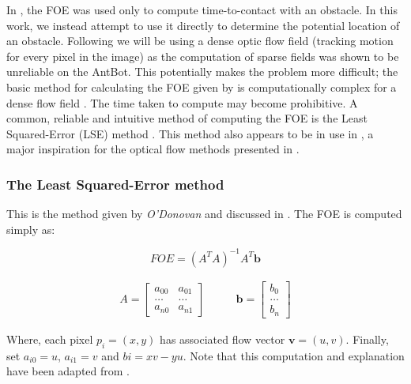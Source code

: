 \documentclass[a4paper,11pt,twoside,openright]{article}
\begin{document}
In \cite{Mitchell2018}, the FOE was used only to compute
time-to-contact with an obstacle. In this work, we instead attempt to
use it directly to determine the potential location of an
obstacle. Following \cite{Mitchell2018} we will be using a dense optic
flow field (tracking motion for every pixel in the image) as the
computation of sparse fields was shown to be unreliable on the
AntBot. This potentially makes the problem more difficult; the basic
method for calculating the FOE given by \cite{ODonovan2005} is
computationally complex for a dense flow field
\cite{Mitchell2018}. The time taken to compute may become
prohibitive. A common, reliable and intuitive method of computing the
FOE is the Least Squared-Error (LSE) method \cite{Tistarelli1991,
  ODonovan2005, Vanderstap2012}. This method also appears to be in use
in \cite{Souhila2007}, a major inspiration for the optical flow
methods presented in \cite{Mitchell2018}.

\subsubsection{The Least Squared-Error method}
This is the method given by \textit{O'Donovan} and discussed in
\cite{Mitchell2018}. The FOE is computed simply as:

\begin{equation}
  \label{eq:foe}
  FOE = (A^TA)^{-1}A^T\mathbf{b}
\end{equation}

\begin{equation*}
  \begin{split}
 A =
\begin{bmatrix}
  a_{00} & a_{01}\\
  \dots  & \dots \\
  a_{n0} &  a_{n1}
\end{bmatrix}
\qquad
\end{split}
\begin{split}
\mathbf{b} =
\begin{bmatrix}
  b_0 \\
  \dots \\
  b_n
\end{bmatrix}
\end{split}
\end{equation*}
\newline

Where, each pixel $p_i = (x, y)$ has associated flow vector $\mathbf{v} = (u,v)$.
Finally, set $a_{i0} = u$, $a_{i1} = v$ and $b{i} = xv - yu$. Note that this
computation and explanation have been adapted from \cite{Mitchell2018}.
\newline
\par
\end{document}
